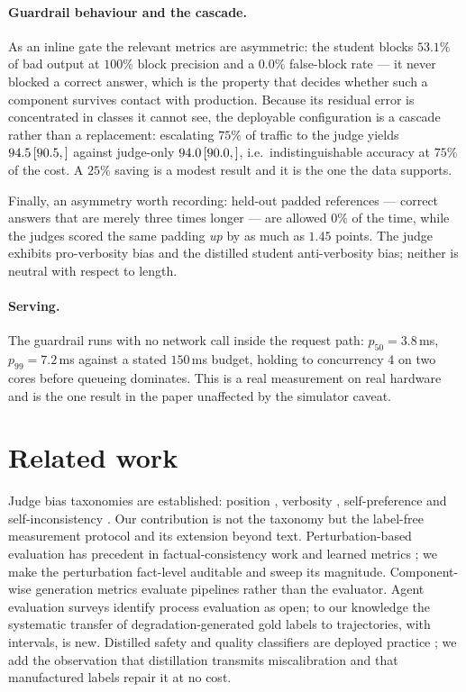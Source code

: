 \documentclass[10pt,letterpaper]{article}
\newcommand{\ci}[3]{\,[#1,\,#3]}
\begin{document}
\paragraph{Guardrail behaviour and the cascade.}
As an inline gate the relevant metrics are asymmetric: the student blocks $53.1\%$ of bad output at
$100\%$ block precision and a $0.0\%$ false-block rate --- it never blocked a correct answer, which
is the property that decides whether such a component survives contact with production. Because its
residual error is concentrated in classes it cannot see, the deployable configuration is a cascade
rather than a replacement: escalating $75\%$ of traffic to the judge yields $94.5\ci{90.5}{97.0}$
against judge-only $94.0\ci{90.0}{96.5}$, i.e.\ indistinguishable accuracy at $75\%$ of the cost. A
$25\%$ saving is a modest result and it is the one the data supports.

Finally, an asymmetry worth recording: held-out padded references --- correct answers that are
merely three times longer --- are allowed $0\%$ of the time, while the judges scored the same
padding \emph{up} by as much as $1.45$ points. The judge exhibits pro-verbosity bias and the
distilled student anti-verbosity bias; neither is neutral with respect to length.

\paragraph{Serving.}
The guardrail runs with no network call inside the request path: $p_{50} = 3.8$\,ms,
$p_{99} = 7.2$\,ms against a stated $150$\,ms budget, holding to concurrency $4$ on two cores before
queueing dominates. This is a real measurement on real hardware and is the one result in the paper
unaffected by the simulator caveat.

\section{Related work}

Judge bias taxonomies are established: position \cite{wang2024large}, verbosity
\cite{zeng2024evaluating}, self-preference \cite{panickssery2024selfpreference} and
self-inconsistency \cite{stureborg2024large}. Our contribution is not the taxonomy but the
label-free measurement protocol and its extension beyond text. Perturbation-based evaluation has
precedent in factual-consistency work \cite{kryscinski2020evaluating} and learned metrics
\cite{sellam2020bleurt}; we make the perturbation fact-level auditable and sweep its magnitude.
Component-wise generation metrics \cite{es2024ragas} evaluate pipelines rather than the evaluator.
Agent evaluation surveys \cite{yehudai2025survey} identify process evaluation as open; to our
knowledge the systematic transfer of degradation-generated gold labels to trajectories, with
intervals, is new. Distilled safety and quality classifiers are deployed practice
\cite{inan2023llamaguard}; we add the observation that distillation transmits miscalibration and
that manufactured labels repair it at no cost.
\end{document}
